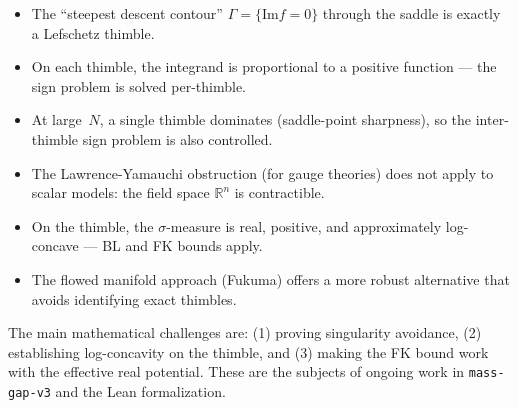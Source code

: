 \documentclass[12pt]{article}
\theoremstyle{definition}
\theoremstyle{remark}
\newcommand{\R}{\mathbb{R}}
\newcommand{\im}{\mathrm{Im}}
\begin{document}
\begin{itemize}
\item The ``steepest descent contour'' $\Gamma = \{\im f = 0\}$
  through the saddle is exactly a Lefschetz thimble.
\item On each thimble, the integrand is proportional to a positive
  function --- the sign problem is solved per-thimble.
\item At large~$N$, a single thimble dominates (saddle-point
  sharpness), so the inter-thimble sign problem is also controlled.
\item The Lawrence-Yamauchi obstruction (for gauge theories) does
  not apply to scalar models: the field space $\R^n$ is contractible.
\item On the thimble, the $\sigma$-measure is real, positive, and
  approximately log-concave --- BL and FK bounds apply.
\item The flowed manifold approach (Fukuma) offers a more robust
  alternative that avoids identifying exact thimbles.
\end{itemize}

The main mathematical challenges are: (1) proving singularity
avoidance, (2) establishing log-concavity on the thimble, and
(3) making the FK bound work with the effective real potential.
These are the subjects of ongoing work in \texttt{mass-gap-v3}
and the Lean formalization.
\end{document}
